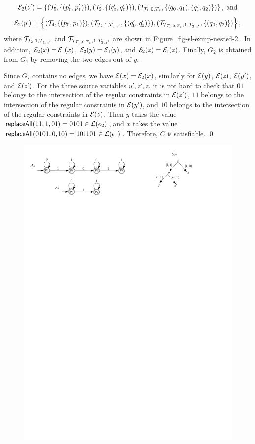 \begin{example}
\begin{itemize}
$$\mathcal{E}_2(z')=\left\{(\mathcal{T}_5, \{(p^{\prime}_0, p^{\prime}_1)\}), (\mathcal{T}_2, \{(q^\prime_0, q^\prime_0)\}), (\mathcal{T}_{\mathcal{T}_1, 0, T_z}, \{(q_0,q_1),(q_1,q_2)\}) \right\}, \text{ and}$$
$$\mathcal{E}_2(y')=\left\{ (\mathcal{T}_4, \{(p_0, p_1)\}), (\mathcal{T}_{\mathcal{T}_2, 1, T_{1,z'}}, \{(q^\prime_0, q^\prime_0)\}), (\mathcal{T}_{\mathcal{T}_{\mathcal{T}_1, 0, T_z}, 1, T_{2,z'}}, \{(q_0,q_2)\}) \right\},$$
where $\mathcal{T}_{\mathcal{T}_2, 1, T_{1,z'}}$ and $\mathcal{T}_{\mathcal{T}_{\mathcal{T}_1, 0, T_z}, 1, T_{2,z'}}$ are shown in Figure~\ref{fig-sl-exmp-nested-2}. In addition, $\mathcal{E}_2(x)=\mathcal{E}_1(x)$, $\mathcal{E}_2(y)=\mathcal{E}_1(y)$, and $\mathcal{E}_2(z)=\mathcal{E}_1(z)$. Finally, $G_2$ is obtained from $G_1$ by removing the two edges out of $y$.
%
\end{itemize}
Since $G_2$ contains no edges, we have $\mathcal{E}(x)=\mathcal{E}_2(x)$, similarly for $\mathcal{E}(y)$, $\mathcal{E}(z)$, $\mathcal{E}(y')$, and $\mathcal{E}(z')$.
For the three source variables $y', z', z$, it is not hard to check that $01$ belongs to the intersection of the regular constraints in $\mathcal{E}(z')$, $11$ belongs to the intersection of the regular constraints in $\mathcal{E}(y')$, and $10$ belongs to the intersection of the regular constraints in $\mathcal{E}(z)$. Then $y$ takes the value $\mathsf{replaceAll}(11, 1, 01)=0101 \in \mathcal{L}(e_2)$, and $x$ takes the value $\mathsf{replaceAll}(0101, 0, 10)=101101 \in \mathcal{L}(e_1)$. Therefore, $C$ is satisfiable. \qed
\begin{figure}[htbp]
\begin{center}
\includegraphics[scale=0.7]{single-letter-example-nested.pdf}

\end{center}
\end{figure}
\end{example}
